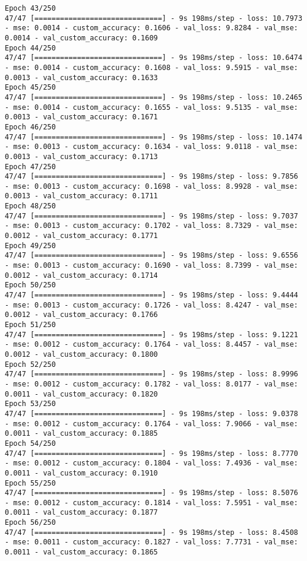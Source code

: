 \begin{lstlisting}
Epoch 43/250
47/47 [==============================] - 9s 198ms/step - loss: 10.7973 - mse: 0.0014 - custom_accuracy: 0.1606 - val_loss: 9.8284 - val_mse: 0.0014 - val_custom_accuracy: 0.1609
Epoch 44/250
47/47 [==============================] - 9s 198ms/step - loss: 10.6474 - mse: 0.0014 - custom_accuracy: 0.1608 - val_loss: 9.5915 - val_mse: 0.0013 - val_custom_accuracy: 0.1633
Epoch 45/250
47/47 [==============================] - 9s 198ms/step - loss: 10.2465 - mse: 0.0014 - custom_accuracy: 0.1655 - val_loss: 9.5135 - val_mse: 0.0013 - val_custom_accuracy: 0.1671
Epoch 46/250
47/47 [==============================] - 9s 198ms/step - loss: 10.1474 - mse: 0.0013 - custom_accuracy: 0.1634 - val_loss: 9.0118 - val_mse: 0.0013 - val_custom_accuracy: 0.1713
Epoch 47/250
47/47 [==============================] - 9s 198ms/step - loss: 9.7856 - mse: 0.0013 - custom_accuracy: 0.1698 - val_loss: 8.9928 - val_mse: 0.0013 - val_custom_accuracy: 0.1711
Epoch 48/250
47/47 [==============================] - 9s 198ms/step - loss: 9.7037 - mse: 0.0013 - custom_accuracy: 0.1702 - val_loss: 8.7329 - val_mse: 0.0012 - val_custom_accuracy: 0.1771
Epoch 49/250
47/47 [==============================] - 9s 198ms/step - loss: 9.6556 - mse: 0.0013 - custom_accuracy: 0.1690 - val_loss: 8.7399 - val_mse: 0.0012 - val_custom_accuracy: 0.1714
Epoch 50/250
47/47 [==============================] - 9s 198ms/step - loss: 9.4444 - mse: 0.0013 - custom_accuracy: 0.1726 - val_loss: 8.4247 - val_mse: 0.0012 - val_custom_accuracy: 0.1766
Epoch 51/250
47/47 [==============================] - 9s 198ms/step - loss: 9.1221 - mse: 0.0012 - custom_accuracy: 0.1764 - val_loss: 8.4457 - val_mse: 0.0012 - val_custom_accuracy: 0.1800
Epoch 52/250
47/47 [==============================] - 9s 198ms/step - loss: 8.9996 - mse: 0.0012 - custom_accuracy: 0.1782 - val_loss: 8.0177 - val_mse: 0.0011 - val_custom_accuracy: 0.1820
Epoch 53/250
47/47 [==============================] - 9s 198ms/step - loss: 9.0378 - mse: 0.0012 - custom_accuracy: 0.1764 - val_loss: 7.9066 - val_mse: 0.0011 - val_custom_accuracy: 0.1885
Epoch 54/250
47/47 [==============================] - 9s 198ms/step - loss: 8.7770 - mse: 0.0012 - custom_accuracy: 0.1804 - val_loss: 7.4936 - val_mse: 0.0011 - val_custom_accuracy: 0.1910
Epoch 55/250
47/47 [==============================] - 9s 198ms/step - loss: 8.5076 - mse: 0.0012 - custom_accuracy: 0.1814 - val_loss: 7.5951 - val_mse: 0.0011 - val_custom_accuracy: 0.1877
Epoch 56/250
47/47 [==============================] - 9s 198ms/step - loss: 8.4508 - mse: 0.0011 - custom_accuracy: 0.1827 - val_loss: 7.7731 - val_mse: 0.0011 - val_custom_accuracy: 0.1865

\end{lstlisting}
